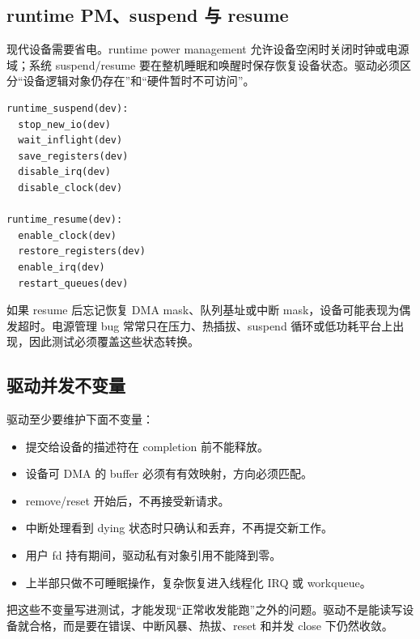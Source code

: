 \subsection{runtime PM、suspend 与 resume}

现代设备需要省电。runtime power management 允许设备空闲时关闭时钟或电源域；系统 suspend/resume 要在整机睡眠和唤醒时保存恢复设备状态。驱动必须区分“设备逻辑对象仍存在”和“硬件暂时不可访问”。

\begin{lstlisting}
runtime_suspend(dev):
  stop_new_io(dev)
  wait_inflight(dev)
  save_registers(dev)
  disable_irq(dev)
  disable_clock(dev)

runtime_resume(dev):
  enable_clock(dev)
  restore_registers(dev)
  enable_irq(dev)
  restart_queues(dev)
\end{lstlisting}

如果 resume 后忘记恢复 DMA mask、队列基址或中断 mask，设备可能表现为偶发超时。电源管理 bug 常常只在压力、热插拔、suspend 循环或低功耗平台上出现，因此测试必须覆盖这些状态转换。

\subsection{驱动并发不变量}

驱动至少要维护下面不变量：

\begin{itemize}
\tightlist
\item 提交给设备的描述符在 completion 前不能释放。
\item 设备可 DMA 的 buffer 必须有有效映射，方向必须匹配。
\item remove/reset 开始后，不再接受新请求。
\item 中断处理看到 dying 状态时只确认和丢弃，不再提交新工作。
\item 用户 fd 持有期间，驱动私有对象引用不能降到零。
\item 上半部只做不可睡眠操作，复杂恢复进入线程化 IRQ 或 workqueue。
\end{itemize}

把这些不变量写进测试，才能发现“正常收发能跑”之外的问题。驱动不是能读写设备就合格，而是要在错误、中断风暴、热拔、reset 和并发 close 下仍然收敛。
